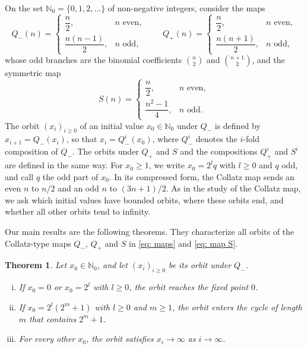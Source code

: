 \documentclass{article}
\newtheorem{theorem}{Theorem}
\newcommand{\Ge}{\geqslant}
\begin{document}
On the set $\mathbb N_0 = \{0, 1, 2, \dots\}$ of non-negative integers, consider the maps
\begin{equation}
    Q_-(n) =
    \begin{cases}
        \dfrac n2 , & n \text{ even} , \\[6pt]
        \dfrac{n(n-1)}{2} , & n \text{ odd} ,
    \end{cases}
    \qquad
    Q_+(n) =
    \begin{cases}
        \dfrac n2 , & n \text{ even} , \\[6pt]
        \dfrac{n(n+1)}{2} , & n \text{ odd} ,
    \end{cases}
    \label{eq: maps}
\end{equation}
whose odd branches are the binomial coefficients $\binom n2$ and $\binom{n+1}2$, and the symmetric map
\begin{equation}
    S(n) =
    \begin{cases}
        \dfrac n2 , & n \text{ even} , \\[6pt]
        \dfrac{n^2 - 1}{4} , & n \text{ odd} .
    \end{cases}
    \label{eq: map S}
\end{equation}
The orbit $(x_i)_{i \Ge 0}$ of an initial value $x_0 \in \mathbb N_0$ under $Q_-$ is defined by $x_{i+1} = Q_-(x_i)$, so that $x_i = Q_-^i(x_0)$, where $Q_-^i$ denotes the $i$-fold composition of $Q_-$. The orbits under $Q_+$ and $S$ and the compositions $Q_+^i$ and $S^i$ are defined in the same way. For $x_0 \Ge 1$, we write $x_0 = 2^l q$ with $l \Ge 0$ and $q$ odd, and call $q$ the odd part of $x_0$. In its compressed form, the Collatz map sends an even $n$ to $n/2$ and an odd $n$ to $(3n+1)/2$. As in the study of the Collatz map, we ask which initial values have bounded orbits, where these orbits end, and whether all other orbits tend to infinity.

Our main results are the following theorems. They characterize all orbits of the Collatz-type maps $Q_-$, $Q_+$ and $S$ in \eqref{eq: maps} and \eqref{eq: map S}.
\clearpage

\begin{theorem}
\label{thm: minus}
    Let $x_0 \in \mathbb N_0$, and let $(x_i)_{i \Ge 0}$ be its orbit under $Q_-$.
    \begin{enumerate}[(i)]
        \setlength{\itemsep}{0pt}
        \item If $x_0 = 0$ or $x_0 = 2^l$ with $l \Ge 0$, the orbit reaches the fixed point $0$.
        \item If $x_0 = 2^l (2^m + 1)$ with $l \Ge 0$ and $m \Ge 1$, the orbit enters the cycle of length $m$ that contains $2^m + 1$.
        \item For every other $x_0$, the orbit satisfies $x_i \to \infty$ as $i \to \infty$.
    \end{enumerate}
\end{theorem}
\end{document}
